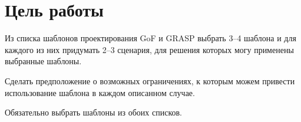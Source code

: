 \section*{Цель работы}

Из списка шаблонов проектирования GoF и GRASP выбрать 3--4 шаблона
и для каждого из них придумать 2--3 сценария,
для решения которых могу применены выбранные шаблоны.

Сделать предположение о возможных ограничениях,
к которым можем привести использование шаблона в каждом описанном случае.

Обязательно выбрать шаблоны из обоих списков.
